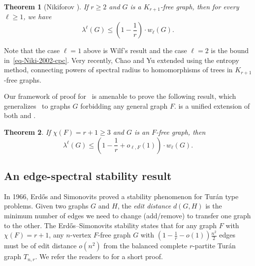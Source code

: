 \documentclass[11pt,a4paper]{article}
\newtheorem{theorem}{Theorem}[section]
\theoremstyle{definition}
\theoremstyle{remark}
\begin{document}
\begin{theorem}[Nikiforov \cite{Niki2006-walks}] \label{thm-Niki-2006}
    If $r\ge 2$ and $G$ is a $K_{r+1}$-free graph, then for every $\ell \ge 1$, we have
    $$\lambda^\ell (G) \leq \left( 1- \frac{1}{r}\right)\cdot w_\ell(G).$$
\end{theorem}
Note that the case $\ell=1$ above is Wilf's result and the case $\ell=2$ is the bound in~\eqref{eq-Niki-2002-cpc}.
Very recently, Chao and Yu \cite{Chao-Yu-2024} extended  
using the entropy method, connecting powers of spectral radius to homomorphisms of trees in $K_{r+1}$-free graphs. 

Our framework of proof for~ is amenable to prove the following result, which generalizes~ to graphs $G$ forbidding any general graph $F$.  is a unified extension of both  and . 

\begin{theorem}
    \label{thm:walk}
    If $\chi (F) = r+1\ge 3$ and $G$ is an $F$-free  graph, then 
    $$\lambda^{\ell} (G) \leq \left(1- \frac{1}{r} + o_{\ell, F}(1)\right) \cdot w_\ell(G).$$
\end{theorem} 
 
 




\subsection{An edge-spectral stability result}





In 1966, 
Erd\H{o}s \cite{Erd1966Sta1,Erd1966Sta2} and Simonovits \cite{Sim1966} proved a stability phenomenon for Tur\'{a}n type problems. Given two graphs $G$ and $H$, the \emph{edit distance} $d(G, H)$ is the minimum number of edges we need to change (add/remove) to transfer one graph to the other. The Erd\H{o}s--Simonovits stability states that for any graph $F$ with $\chi (F)=r+1$, any $n$-vertex $F$-free graph $G$ with  
$\left( 1-\frac{1}{r}-o(1) \right)\frac{n^2}{2}$ edges must be of edit distance $o(n^2)$ from the balanced complete $r$-partite Tur\'{a}n graph $T_{n,r}$. 
We refer the readers to \cite{Fur2015} for a short proof. 
\end{document}
